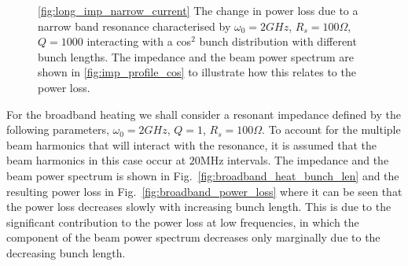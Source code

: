 \begin{figure}
\caption{\ref{fig:long_imp_narrow_current} The change in power loss due to a narrow band resonance characterised by $\omega_{0} = 2GHz$, $R_{s} = 100\Omega$, $Q = 1000$ interacting with a cos$^{2}$ bunch distribution with different bunch lengths. The impedance and the beam power spectrum are shown in \ref{fig:imp_profile_cos} to illustrate how this relates to the power loss.}
\end{figure}

For the broadband heating we shall consider a resonant impedance defined by the following parameters, $\omega_{0} = 2GHz$, $Q=1$, $R_{s}=100\Omega$. To account for the multiple beam harmonics that will interact with the resonance, it is assumed that the beam harmonics in this case occur at $20$MHz intervals. The impedance and the beam power spectrum is shown in Fig.~\ref{fig:broadband_heat_bunch_len} and the resulting power loss in Fig.~\ref{fig:broadband_power_loss} where it can be seen that the power loss decreases slowly with increasing bunch length. This is due to the significant contribution to the power loss at low frequencies, in which the component of the beam power spectrum decreases only marginally due to the decreasing bunch length.

